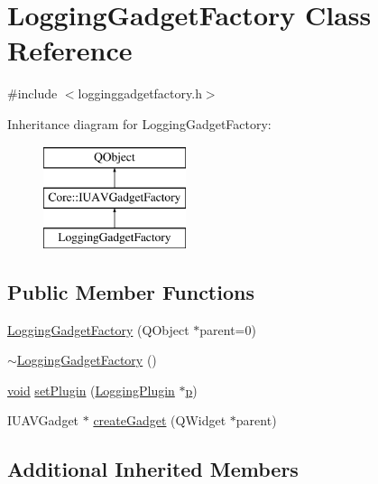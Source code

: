 \hypertarget{class_logging_gadget_factory}{\section{Logging\-Gadget\-Factory Class Reference}
\label{class_logging_gadget_factory}
}


{\ttfamily \#include $<$logginggadgetfactory.\-h$>$}

Inheritance diagram for Logging\-Gadget\-Factory\-:\begin{figure}[H]
\begin{center}
\leavevmode
\includegraphics[height=3.000000cm]{class_logging_gadget_factory}
\end{center}
\end{figure}
\subsection*{Public Member Functions}
\begin{DoxyCompactItemize}
\item 
\hyperlink{group___g_c_s_control_gadget_plugin_gaef9e98419a7dd5551cd13876c2c4b357}{Logging\-Gadget\-Factory} (Q\-Object $\ast$parent=0)
\item 
\hyperlink{group___g_c_s_control_gadget_plugin_ga6ddd468f9f7b722281dc55df5d991dc1}{$\sim$\-Logging\-Gadget\-Factory} ()
\item 
\hyperlink{group___u_a_v_objects_plugin_ga444cf2ff3f0ecbe028adce838d373f5c}{void} \hyperlink{group___g_c_s_control_gadget_plugin_ga00c5e0af9d177e7d271c0d6dcd6f4601}{set\-Plugin} (\hyperlink{class_logging_plugin}{Logging\-Plugin} $\ast$\hyperlink{glext_8h_aa5367c14d90f462230c2611b81b41d23}{p})
\item 
I\-U\-A\-V\-Gadget $\ast$ \hyperlink{group___g_c_s_control_gadget_plugin_ga95ee0680e9c323e77341bef36195bdf5}{create\-Gadget} (Q\-Widget $\ast$parent)
\end{DoxyCompactItemize}
\subsection*{Additional Inherited Members}



